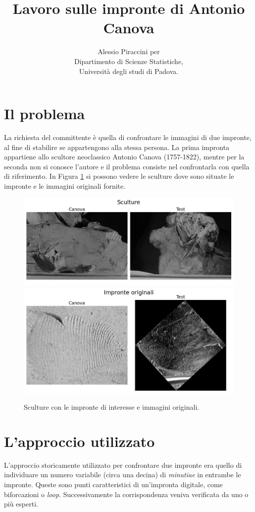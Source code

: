 \documentclass[12pt]{article}
\title{\vspace{-1.5cm}Lavoro sulle impronte di Antonio Canova}
\author{Alessio Piraccini per \\Dipartimento di Scienze Statistiche,\\Università degli studi di Padova.}
\date{}
\begin{document}
\maketitle

\section*{Il problema}
\noindent
La richiesta del committente è quella di confrontare le immagini di due impronte, al fine di stabilire se appartengono alla stessa persona. La prima impronta appartiene allo scultore neoclassico Antonio Canova (1757-1822), mentre per la seconda non si conosce l'autore e il problema consiste nel confrontarla con quella di riferimento. In Figura \ref{fig:sculture_rawfp} si possono vedere le sculture dove sono situate le impronte e le immagini originali fornite.
 
\begin{figure}[!htb]
    \centering
    \includegraphics[width=1.0\textwidth]{figures/sculptures.jpg}
    \includegraphics[width=1.0\textwidth]{figures/raw_fingerprints.jpg}
    \caption{Sculture con le impronte di interesse e immagini originali.}
    \label{fig:sculture_rawfp}
\end{figure}

\section*{L'approccio utilizzato}
\noindent
L'approccio storicamente utilizzato per confrontare due impronte era quello di individuare un numero variabile (circa una decina) di \emph{minutiae} in entrambe le impronte. Queste sono punti caratteristici di un'impronta digitale, come biforcazioni o \emph{loop}. Successivamente la corrispondenza veniva verificata da uno o più esperti.
\end{document}
